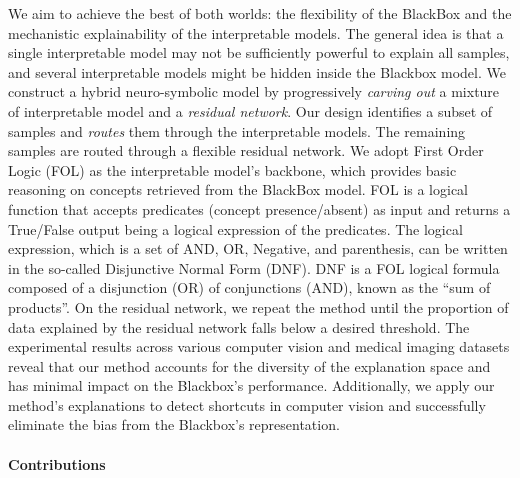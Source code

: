 We aim to achieve the best of both worlds: the flexibility of the BlackBox and the mechanistic explainability of the interpretable models. The general idea is that a single interpretable model may not be sufficiently powerful to explain all samples, and several interpretable models might be hidden inside the Blackbox model. We construct a hybrid neuro-symbolic model by progressively \emph{carving out} a mixture of interpretable model and a \emph{residual network}. Our design identifies a subset of samples and \emph{routes} them through the interpretable models. The remaining samples are routed through a flexible residual network. We adopt First Order Logic (FOL) as the interpretable model's backbone, which provides basic reasoning on concepts retrieved from the BlackBox model. 
FOL is a logical function
that accepts predicates (concept presence/absent) as input and returns a True/False output being a
logical expression of the predicates. The logical expression, which is a set of AND, OR, Negative,
and parenthesis, can be written in the so-called Disjunctive Normal Form (DNF). DNF is a FOL logical formula composed of a disjunction (OR) of conjunctions (AND), known as the ``sum of products''.
On the residual network, we repeat the method until the proportion of data explained by the residual network falls below a desired threshold. The experimental results across various computer vision and medical imaging datasets reveal that our method accounts for the diversity of the explanation space and has minimal impact on the Blackbox's performance. Additionally, we apply our method's explanations to detect shortcuts in computer vision and successfully eliminate the bias from the Blackbox's representation.

\paragraph{Contributions}
